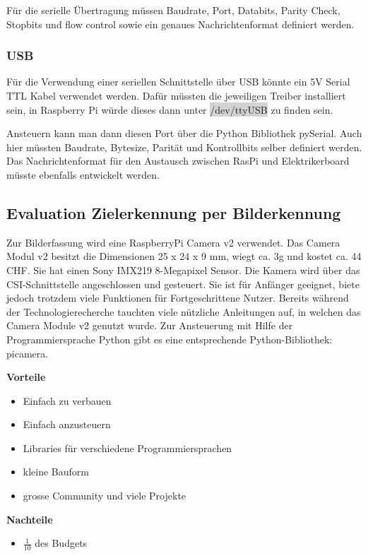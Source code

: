 \documentclass[a4paper]{report}
\begin{document}
Für die serielle Übertragung müssen Baudrate, Port, Databits, Parity Check, Stopbits und flow control sowie ein genaues Nachrichtenformat definiert werden.

\subsubsection{USB}
\label{app:ssec:EvalUSB}
Für die Verwendung einer seriellen Schnittstelle über USB könnte ein 5V Serial TTL Kabel verwendet werden. Dafür müssten die jeweiligen Treiber installiert sein, in Raspberry Pi würde dieses dann unter \colorbox{lightgrey}{/dev/ttyUSB} zu finden sein.

Ansteuern kann man dann diesen Port über die Python Bibliothek pySerial. \parencite{Liechti2017} Auch hier müssten Baudrate, Bytesize, Parität und Kontrollbits selber definiert werden. Das Nachrichtenformat für den Austausch zwischen RasPi und Elektrikerboard müsste ebenfalls entwickelt werden.

\subsection{Evaluation Zielerkennung per Bilderkennung}
\label{app:ssec:EvalZielErkBild}
Zur Bilderfassung wird eine RaspberryPi Camera v2 verwendet. Das Camera Modul v2 besitzt die Dimensionen 25 x 24 x 9 mm, wiegt ca. 3g und kostet ca. 44 CHF.
Sie hat einen Sony IMX219 8-Megapixel Sensor. Die Kamera wird über das CSI-Schnittstelle angeschlossen und gesteuert. Sie ist für Anfänger geeignet, biete jedoch trotzdem viele Funktionen für Fortgeschrittene Nutzer.
Bereits während der Technologierecherche tauchten viele nützliche Anleitungen auf, in welchen das Camera Module v2 genutzt wurde.
Zur Ansteuerung mit Hilfe der Programmiersprache Python gibt es eine entsprechende Python-Bibliothek: picamera.

\begin{multicols}{2}
	\textbf{Vorteile}
	\begin{itemize}[label={+},noitemsep]
		\item Einfach zu verbauen
		\item Einfach anzusteuern
		\item Libraries für verschiedene Programmiersprachen
		\item kleine Bauform
		\item grosse Community und viele Projekte
	\end{itemize}
	\columnbreak
	\textbf{Nachteile}
	\begin{itemize}[label={-},noitemsep]
		\item $\frac{1}{10}$ des Budgets
	\end{itemize}
\end{multicols}
\end{document}
